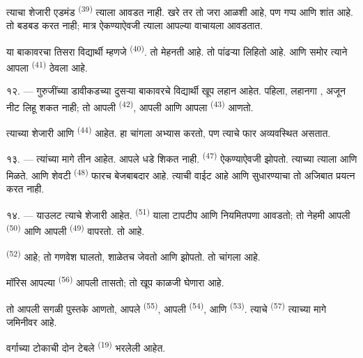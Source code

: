 त्याचा शेजारी एडमंड \textsuperscript{(39)} त्याला आवडत नाही. खरे तर तो जरा आळशी
आहे, पण गप्प आणि शांत आहे. तो बडबड करत नाही; मात्र ऐकण्याऐवजी त्याला आपल्या
  वाचायला आवडतात.

या बाकावरचा तिसरा विद्यार्थी म्हणजे  \textsuperscript{(40)}. तो मेहनती
आहे. तो पांढऱ्या  लिहितो आहे. आणि समोर त्याने आपला
 \textsuperscript{(41)} ठेवला आहे.

१२. --- गुरुजींच्या डावीकडच्या दुसऱ्या बाकावरचे विद्यार्थी खूप लहान आहेत.
पहिला, लहानगा , अजून नीट लिहू शकत नाही; तो आपली 
\textsuperscript{(42)}, आपली  आणि आपला 
\textsuperscript{(43)} आणतो.

त्याच्या शेजारी  आणि  \textsuperscript{(44)} आहेत.
हा चांगला अभ्यास करतो, पण त्याचे  फार अव्यवस्थित असतात.

१३. --- त्यांच्या मागे तीन  आहेत.  आपले धडे शिकत
नाही.  \textsuperscript{(47)} ऐकण्याऐवजी झोपतो. त्याच्या
 त्याला  आणि  मिळते. आणि शेवटी
 \textsuperscript{(48)} फारच बेजबाबदार आहे. त्याची
 वाईट आहे आणि सुधारण्याचा तो अजिबात प्रयत्न करत नाही.

१४. --- याउलट त्याचे शेजारी  आहेत. 
\textsuperscript{(51)} याला टापटीप आणि नियमितपणा आवडतो; तो नेहमी आपली
 \textsuperscript{(50)} आणि आपली  \textsuperscript{(49)}
वापरतो. तो  आहे.

 \textsuperscript{(52)}  आहे; तो गणवेश
घालतो, शाळेतच जेवतो आणि झोपतो. तो चांगला  आहे.

मॉरिस आपल्या  \textsuperscript{(56)} आपली  तासतो; तो
खूप काळजी घेणारा आहे.

तो आपली सगळी पुस्तके आणतो, आपले  \textsuperscript{(55)}, आपली
 \textsuperscript{(54)}, आणि 
\textsuperscript{(53)}. त्याचे  \textsuperscript{(57)} त्याच्या मागे
जमिनीवर आहे.

वर्गाच्या टोकाची दोन टेबले  \textsuperscript{(19)}
भरलेली आहेत.

